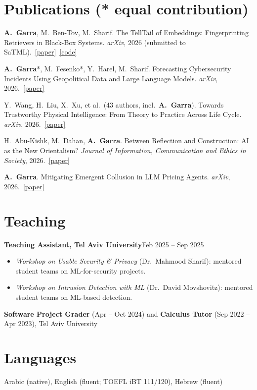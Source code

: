 \documentclass[10pt,letterpaper]{article}
\newcommand{\entry}[4]{%
  \textbf{#1}\hfill #2%
  \if\relax\detokenize{#3}\relax\else\\\textit{#3}\hfill\textit{#4}\fi\par\vspace{2pt}}
\newcommand{\me}{\textbf{A.~Garra}}
\newcommand{\paper}[1]{\href{https://arxiv.org/abs/#1}{\color{maroon}[paper]}}
\begin{document}
\section{Publications \normalfont\small(* equal contribution)}
\begin{enumerate}[leftmargin=1.7em,itemsep=2pt,parsep=0pt,topsep=2pt,label={\color{maroon}[\arabic*]}]
  \item \me, M.~Ben-Tov, M.~Sharif. The TellTail of Embeddings: Fingerprinting Retrievers in Black-Box Systems. \textit{arXiv}, 2026 (submitted to SaTML).~\paper{2610.04026}~\href{https://github.com/abdullahgarra/telltail}{\color{maroon}[code]}
  \item \me*, M.~Fesenko*, Y.~Harel, M.~Sharif. Forecasting Cybersecurity Incidents Using Geopolitical Data and Large Language Models.
        \textit{arXiv}, 2026.~\paper{2610.04798}
  \item Y.~Wang, H.~Liu, X.~Xu, et al.\ (43 authors, incl.\ \me). Towards Trustworthy Physical Intelligence: From
        Theory to Practice Across Life Cycle. \textit{arXiv}, 2026.~\paper{2607.22877}
  \item H.~Abu-Kishk, M.~Dahan, \me. Between Reflection and Construction: AI as the New Orientalism?
        \textit{Journal of Information, Communication and Ethics in Society}, 2026.~\href{https://doi.org/10.1108/jices-07-2025-0169}{\color{maroon}[paper]}
  \item \me. Mitigating Emergent Collusion in LLM Pricing Agents. \textit{arXiv}, 2026.~\paper{2609.13037}
\end{enumerate}

\section{Teaching}
\entry{Teaching Assistant, Tel Aviv University}{Feb 2025 -- Sep 2025}{}{}
\begin{itemize}
  \item \textit{Workshop on Usable Security \& Privacy} (Dr.\ Mahmood Sharif): mentored student teams on ML-for-security projects.
  \item \textit{Workshop on Intrusion Detection with ML} (Dr.\ David Movshovitz): mentored student teams on ML-based detection.
\end{itemize}
\textbf{Software Project Grader} (Apr -- Oct 2024) and \textbf{Calculus Tutor} (Sep 2022 -- Apr 2023), Tel Aviv University

\section{Languages}
Arabic (native), English (fluent; TOEFL iBT 111/120), Hebrew (fluent)
\end{document}
